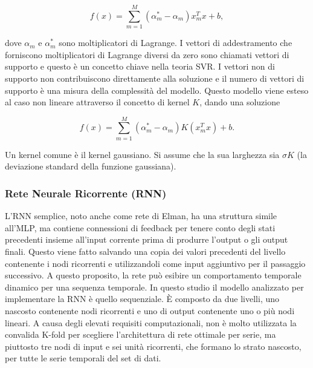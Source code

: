 \documentclass[12pt,a4paper]{report}
\begin{document}
\begin{equation}
    {\displaystyle f(x) = \sum\limits_{m=1}^{M}(\alpha^*_m - \alpha_m)x_m^Tx + b},
\end{equation}

dove $\alpha_m$ e $\alpha_m^\ast$ sono moltiplicatori di Lagrange. I vettori di addestramento che forniscono moltiplicatori di Lagrange diversi da zero sono chiamati vettori di supporto e questo è un concetto chiave nella teoria SVR. I vettori non di supporto non contribuiscono direttamente alla soluzione e il numero di vettori di supporto è una misura della complessità del modello. Questo modello viene esteso al caso non lineare attraverso il concetto di kernel $K$, dando una soluzione

\begin{equation}
    {\displaystyle f(x) = \sum\limits_{m=1}^{M}(\alpha^*_m - \alpha_m)K(x_m^Tx) + b}.
\end{equation}

Un kernel comune è il kernel gaussiano. Si assume che la sua larghezza sia $\sigma K$ (la deviazione standard della funzione gaussiana).


\subsubsection{Rete Neurale Ricorrente (RNN)}
L'RNN semplice, noto anche come rete di Elman, ha una struttura simile all'MLP, ma contiene connessioni di feedback per tenere conto degli stati precedenti insieme all'input corrente prima di produrre l'output o gli output finali.
Questo viene fatto salvando una copia dei valori precedenti del livello contenente i nodi ricorrenti e utilizzandoli come input aggiuntivo per il passaggio successivo. A questo proposito, la rete può esibire un comportamento temporale dinamico per una sequenza temporale.
In questo studio il modello analizzato per implementare la RNN è quello sequenziale. È composto da due livelli, uno nascosto contenente nodi ricorrenti e uno di output contenente uno o più nodi lineari. A causa degli elevati requisiti computazionali, non è molto utilizzata la convalida K-fold per scegliere l'architettura di rete ottimale per serie, ma piuttosto tre nodi di input e sei unità ricorrenti, che formano lo strato nascosto, per tutte le serie temporali del set di dati. 
\end{document}
